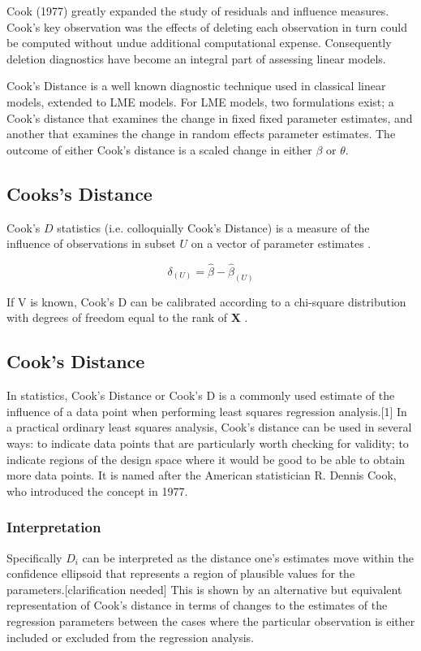 \documentclass[Main.tex]{subfiles}
\begin{document}
	
	Cook (1977) greatly expanded the study of residuals and influence measures. Cook's key observation was the effects of deleting each observation in turn could be computed without undue additional computational expense. Consequently deletion diagnostics have become an integral part of assessing linear models.
	
	Cook's Distance is a well known diagnostic technique used in classical linear models, extended to LME models.  For LME models, two formulations exist; a Cook's distance that examines the change in fixed fixed parameter estimates, and another that examines the change in random effects parameter estimates. The outcome of either Cook's distance is a scaled change in either $\beta$ or $\theta$.
	
	

	
	\subsection{Cooks's Distance}%
	 Cook's $D$ statistics (i.e. colloquially Cook's Distance) is a measure of the influence of observations in subset $U$ on a vector of parameter estimates \citep{cook77}.
	
	\[ \delta_{(U)} = \hat{\beta} - \hat{\beta}_{(U)}\]
	
	If V is known, Cook's D can be calibrated according to a chi-square distribution with degrees of freedom equal to the rank of $\boldsymbol{X}$ \citep{cpj92}.
	
	\subsection{Cook's Distance}
	In statistics, Cook's Distance or Cook's D is a commonly used estimate of the influence of a data point when performing least squares regression analysis.[1] In a practical ordinary least squares analysis, Cook's distance can be used in several ways: to indicate data points that are particularly worth checking for validity; to indicate regions of the design space where it would be good to be able to obtain more data points. It is named after the American statistician R. Dennis Cook, who introduced the concept in 1977.
	
	
	\subsubsection{Interpretation}
	Specifically $D_i$ can be interpreted as the distance one's estimates move within the confidence ellipsoid that represents a region of plausible values for the parameters.[clarification needed] This is shown by an alternative but equivalent representation of Cook's distance in terms of changes to the estimates of the regression parameters between the cases where the particular observation is either included or excluded from the regression analysis.
	
\end{document}
